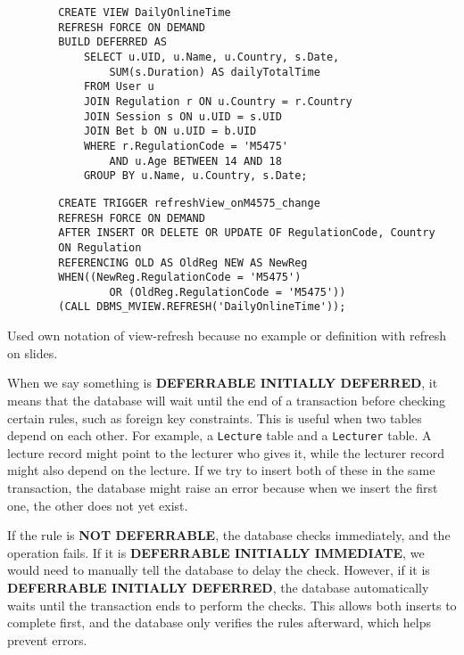 \documentclass{article}
\begin{document}
\begin{enumerate}[label=\alph*)]
        \begin{verbatim}
        CREATE VIEW DailyOnlineTime
        REFRESH FORCE ON DEMAND 
        BUILD DEFERRED AS
            SELECT u.UID, u.Name, u.Country, s.Date, 
                SUM(s.Duration) AS dailyTotalTime
            FROM User u
            JOIN Regulation r ON u.Country = r.Country
            JOIN Session s ON u.UID = s.UID
            JOIN Bet b ON u.UID = b.UID
            WHERE r.RegulationCode = 'M5475' 
                AND u.Age BETWEEN 14 AND 18
            GROUP BY u.Name, u.Country, s.Date;
        \end{verbatim}

        \begin{verbatim}
        CREATE TRIGGER refreshView_onM4575_change
        REFRESH FORCE ON DEMAND 
        AFTER INSERT OR DELETE OR UPDATE OF RegulationCode, Country
        ON Regulation
        REFERENCING OLD AS OldReg NEW AS NewReg
        WHEN((NewReg.RegulationCode = 'M5475')
                OR (OldReg.RegulationCode = 'M5475'))
        (CALL DBMS_MVIEW.REFRESH('DailyOnlineTime'));
        \end{verbatim}

        Used own notation of view-refresh because no example or definition with refresh on slides.
    \end{enumerate}

\task{}
When we say something is \textbf{DEFERRABLE INITIALLY DEFERRED}, it means that the database will wait until the end of a transaction before checking certain rules, such as foreign key constraints. This is useful when two tables depend on each other. For example, a \texttt{Lecture} table and a \texttt{Lecturer} table. A lecture record might point to the lecturer who gives it, while the lecturer record might also depend on the lecture. If we try to insert both of these in the same transaction, the database might raise an error because when we insert the first one, the other does not yet exist.


If the rule is \textbf{NOT DEFERRABLE}, the database checks immediately, and the operation fails. If it is \textbf{DEFERRABLE INITIALLY IMMEDIATE}, we would need to manually tell the database to delay the check. However, if it is \textbf{DEFERRABLE INITIALLY DEFERRED}, the database automatically waits until the transaction ends to perform the checks. This allows both inserts to complete first, and the database only verifies the rules afterward, which helps prevent errors.
\end{document}
